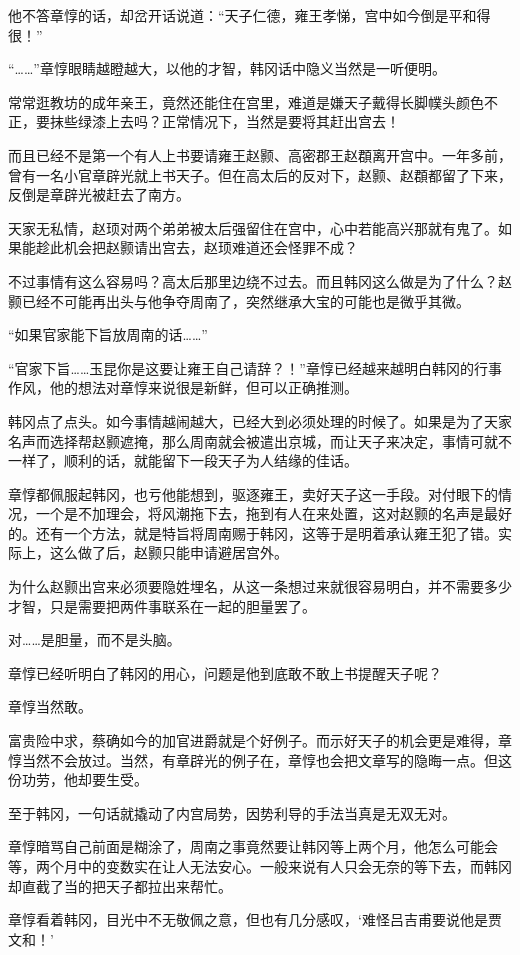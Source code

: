 他不答章惇的话，却岔开话说道：“天子仁德，雍王孝悌，宫中如今倒是平和得很！”

“……”章惇眼睛越瞪越大，以他的才智，韩冈话中隐义当然是一听便明。

常常逛教坊的成年亲王，竟然还能住在宫里，难道是嫌天子戴得长脚幞头颜色不正，要抹些绿漆上去吗？正常情况下，当然是要将其赶出宫去！

而且已经不是第一个有人上书要请雍王赵颢、高密郡王赵頵离开宫中。一年多前，曾有一名小官章辟光就上书天子。但在高太后的反对下，赵颢、赵頵都留了下来，反倒是章辟光被赶去了南方。

天家无私情，赵顼对两个弟弟被太后强留住在宫中，心中若能高兴那就有鬼了。如果能趁此机会把赵颢请出宫去，赵顼难道还会怪罪不成？

不过事情有这么容易吗？高太后那里边绕不过去。而且韩冈这么做是为了什么？赵颢已经不可能再出头与他争夺周南了，突然继承大宝的可能也是微乎其微。

“如果官家能下旨放周南的话……”

“官家下旨……玉昆你是这要让雍王自己请辞？！”章惇已经越来越明白韩冈的行事作风，他的想法对章惇来说很是新鲜，但可以正确推测。

韩冈点了点头。如今事情越闹越大，已经大到必须处理的时候了。如果是为了天家名声而选择帮赵颢遮掩，那么周南就会被遣出京城，而让天子来决定，事情可就不一样了，顺利的话，就能留下一段天子为人结缘的佳话。

章惇都佩服起韩冈，也亏他能想到，驱逐雍王，卖好天子这一手段。对付眼下的情况，一个是不加理会，将风潮拖下去，拖到有人在来处置，这对赵颢的名声是最好的。还有一个方法，就是特旨将周南赐于韩冈，这等于是明着承认雍王犯了错。实际上，这么做了后，赵颢只能申请避居宫外。

为什么赵颢出宫来必须要隐姓埋名，从这一条想过来就很容易明白，并不需要多少才智，只是需要把两件事联系在一起的胆量罢了。

对……是胆量，而不是头脑。

章惇已经听明白了韩冈的用心，问题是他到底敢不敢上书提醒天子呢？

章惇当然敢。

富贵险中求，蔡确如今的加官进爵就是个好例子。而示好天子的机会更是难得，章惇当然不会放过。当然，有章辟光的例子在，章惇也会把文章写的隐晦一点。但这份功劳，他却要生受。

至于韩冈，一句话就撬动了内宫局势，因势利导的手法当真是无双无对。

章惇暗骂自己前面是糊涂了，周南之事竟然要让韩冈等上两个月，他怎么可能会等，两个月中的变数实在让人无法安心。一般来说有人只会无奈的等下去，而韩冈却直截了当的把天子都拉出来帮忙。

章惇看着韩冈，目光中不无敬佩之意，但也有几分感叹，‘难怪吕吉甫要说他是贾文和！’

